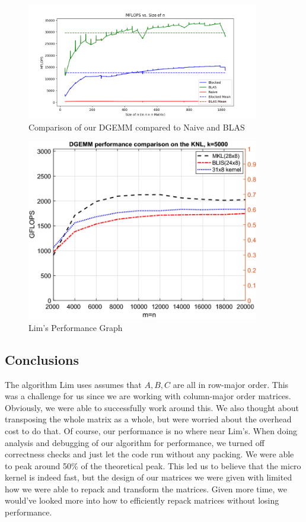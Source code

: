 \documentclass{article}
\begin{document}
\begin{figure}
  \centerline{\includegraphics[width=4in]{figures/MFLOPS_compare.png}}
  \caption{Comparison of our DGEMM compared to Naive and BLAS}
\end{figure}

\begin{figure}
  \centerline{\includegraphics[width=4in]{figures/DGEMM-performance-comparison-for-different-BLAS-libraries-on-the-KNL.png}}
  \caption{Lim's Performance Graph~\cite{10.1007/s10586-018-2810-y}}
\end{figure}



\subsection{Conclusions}
The algorithm Lim uses assumes that $A, B ,C$ are all in row-major order. This was a challenge for us since we are working with column-major order matrices. Obviously, we were able to successfully work around this. We also thought about transposing the whole matrix as a whole, but were worried about the overhead cost to do that. Of course, our performance is no where near Lim's. When doing analysis and debugging of our algorithm for performance, we turned off correctness checks and just let the code run without any packing. We were able to peak around 50\% of the theoretical peak. This led us to believe that the micro kernel is indeed fast, but the design of our matrices we were given with limited how we were able to repack and transform the matrices. Given more time, we would've looked more into how to efficiently repack matrices without losing performance.
\end{document}
